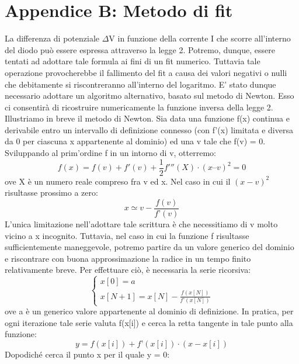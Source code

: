 \documentclass{article}[a4paper, oneside, 11pt]
\begin{document}
\section{Appendice B: Metodo di fit}\label{app: B}
La differenza di potenziale $\Delta$V in funzione della corrente I che scorre all’interno del diodo può essere espressa attraverso la legge 2. Potremo, dunque, essere tentati ad adottare tale formula ai fini di un fit numerico. Tuttavia tale operazione provocherebbe il fallimento del fit a causa dei valori negativi o nulli che debitamente si riscontreranno all’interno del logaritmo. E’ stato dunque necessario adottare un algoritmo alternativo, basato sul metodo di Newton. Esso ci consentirà di ricostruire numericamente la funzione inversa della legge 2.
Illustriamo in breve il metodo di Newton. Sia data una funzione f(x) continua e derivabile entro un intervallo di definizione connesso (con f’(x) limitata e diversa da 0 per ciascuna x appartenente al dominio) ed una v tale che f(v) = 0. Sviluppando al prim’ordine f in un intorno di v, otterremo:
\begin{equation}
f(x) = f(v) + f{'}(v) + {\frac{1}{2}} {f'{''}(X)} \cdot  {( x – v)^2} = 0
\end{equation}
ove X è un numero reale compreso fra v ed x. Nel caso in cui il $(x-v)^2 $risultasse prossimo a zero:
\begin{equation}\label{eq: invsck}
x \simeq v   -  {\frac {f(v)}{f’(v)}}
\end{equation}
L’unica limitazione nell’adottare tale scrittura è che necessitiamo di v molto vicino a x incognito. Tuttavia, nel caso in cui la funzione f risultasse sufficientemente maneggevole, potremo partire da un valore generico del dominio e riscontrare con buona approssimazione la radice in un tempo finito relativamente breve. Per effettuare ciò, è necessaria la serie ricorsiva:
\begin{equation}
\begin{cases}
x[0] = a \\ x[N+1] = x[N] - \frac {f(x[N])} {f’(x[N])}
\end{cases}
\end{equation}
ove a è un generico valore appartenente al dominio di definizione. In pratica, per ogni iterazione tale serie valuta f(x[i]) e cerca la retta tangente in tale punto alla funzione:
\begin{equation}\label{eq: invsck}
y = f(x[i]) + f’(x[i]) \cdot (x-x[i])
\end{equation}
 Dopodiché cerca il punto x per il quale y = 0:
\end{document}
